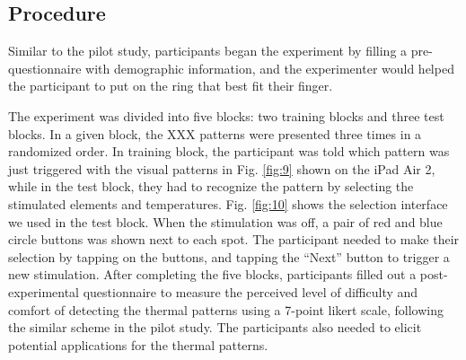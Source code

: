 \documentclass[preprint,12pt]{elsarticle}
\begin{document}
\subsection{Procedure}
Similar to the pilot study, participants began the experiment by filling a pre-questionnaire with demographic information, and the experimenter would helped the participant to put on the ring that best fit their finger.

The experiment was divided into five blocks: two training blocks and three test blocks. In a given block, the XXX patterns were presented three times in a randomized order. In training block, the participant was told which pattern was just triggered with the visual patterns in Fig. \ref{fig:9} shown on the iPad Air 2, while in the test block, they had to recognize the pattern by selecting the stimulated elements and temperatures. Fig. \ref{fig:10} shows the selection interface we used in the test block. When the stimulation was off, a pair of red and blue circle buttons was shown next to each spot. The participant needed to make their selection by tapping on the buttons, and tapping the ``Next'' button to trigger a new stimulation. After completing the five blocks, participants filled out a post-experimental questionnaire to measure the perceived level of difficulty and comfort of detecting the thermal patterns using a 7-point likert scale, following the similar scheme in the pilot study. The participants also needed to elicit potential applications for the thermal patterns.

\end{document}
